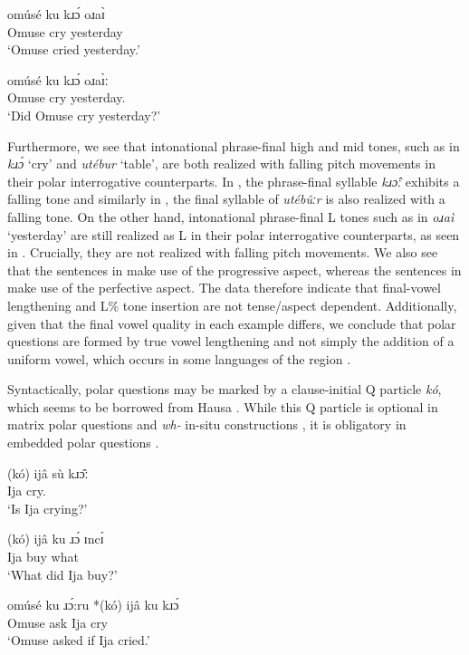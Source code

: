 \documentclass[output=paper,colorlinks,citecolor=brown
]{langscibook}
\begin{document}
\ea \label{ex:matte:new3}
\begin{xlist}

\ex \label{ex:matte:new3a}
\gll omúsé ku kɹɔ́ oɹaɪ̀\\
Omuse \Pfv{} cry yesterday\\
\glt `Omuse cried yesterday.'

\ex \label{ex:matte:new3b}
\gll omúsé ku kɹɔ́ oɹaɪ̀ː\\
Omuse \Pfv{} cry yesterday.\Q{}\\
\glt `Did Omuse cry yesterday?'

\end{xlist}
\z

\noindent Furthermore, we see that intonational phrase-final high and mid tones, such as in  \textit{kɹɔ́} `cry' and  \textit{utébur} ‘table’, are both realized with falling pitch movements in their polar interrogative counterparts. In , the phrase-final syllable \textit{kɹɔ̂ː} exhibits a falling tone and similarly in , the final syllable of \textit{utébûːr} is also realized with a falling tone. On the other hand, intonational phrase-final L tones such as in  \textit{oɹaì} ‘yesterday’ are still realized as L in their polar interrogative counterparts, as seen in . Crucially, they are not realized with falling pitch movements. We also see that the sentences in  make use of the progressive aspect, whereas the sentences in  make use of the perfective aspect. The data therefore indicate that final-vowel lengthening and L\% tone insertion are not tense/aspect dependent. Additionally, given that the final vowel quality in each example differs, we conclude that polar questions are formed by true vowel lengthening and not simply the addition of a uniform vowel, which occurs in some languages of the region \citep{Rialland2007, Cahill2015}.

Syntactically, polar questions may be marked by a clause-initial Q particle \textit{kó}, which seems to be borrowed from Hausa \citep{Bawa2023}. While this Q particle is optional in matrix polar questions  and \textit{wh-} in-situ constructions , it is obligatory in embedded polar questions .

\ea \label{ex:matte:3}
\begin{xlist}

\ex \label{ex:matte:3a}
\gll (kó) ijâ sù kɹɔ̂ː\\
\Q{} Ija \Prog{} cry.\Q{}\\
\glt `Is Ija crying?'

\ex \label{ex:matte:3c}
\gll (kó) ijâ ku ɹɔ́ ɪncɪ́\\
\Q{} Ija \Pfv{} buy what\\
\glt `What did Ija buy?'

\ex \label{ex:matte:3b}
\gll omúsé ku ɹɔ́:ru *(kó) ijâ ku kɹɔ́\\
Omuse \Pfv{} ask \Q{} Ija \Pfv{} cry\\
\glt `Omuse asked if Ija cried.'

\end{xlist} 
\z
\end{document}
